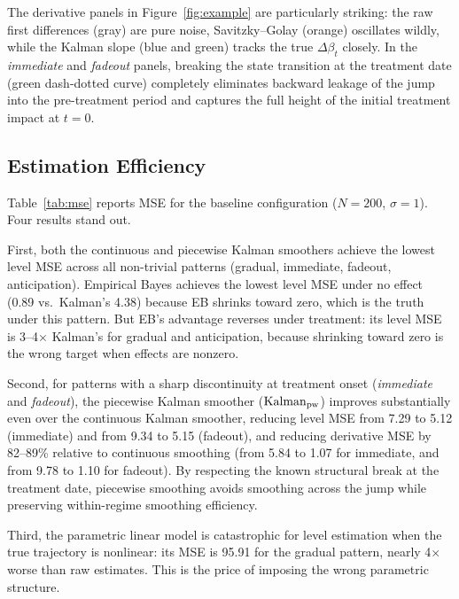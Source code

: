 \documentclass[12pt]{article}
\begin{document}
The derivative panels in Figure~\ref{fig:example} are particularly striking: the raw first differences (gray) are pure noise, Savitzky--Golay (orange) oscillates wildly, while the Kalman slope (blue and green) tracks the true $\Delta\beta_t$ closely. In the \emph{immediate} and \emph{fadeout} panels, breaking the state transition at the treatment date (green dash-dotted curve) completely eliminates backward leakage of the jump into the pre-treatment period and captures the full height of the initial treatment impact at $t = 0$.

\subsection{Estimation Efficiency}

Table~\ref{tab:mse} reports MSE for the baseline configuration ($N = 200$, $\sigma = 1$). Four results stand out.

\begin{table}[H]
\centering
\caption{Level and Derivative MSE ($\times 10^3$), $N = 200$, $\sigma = 1$, 1{,}000 simulations}\label{tab:mse}

\end{table}

First, both the continuous and piecewise Kalman smoothers achieve the lowest level MSE across all non-trivial patterns (gradual, immediate, fadeout, anticipation). Empirical Bayes achieves the lowest level MSE under no effect (0.89 vs.\ Kalman's 4.38) because EB shrinks toward zero, which is the truth under this pattern. But EB's advantage reverses under treatment: its level MSE is 3--4$\times$ Kalman's for gradual and anticipation, because shrinking toward zero is the wrong target when effects are nonzero.

Second, for patterns with a sharp discontinuity at treatment onset (\emph{immediate} and \emph{fadeout}), the piecewise Kalman smoother ($\text{Kalman}_{\rm pw}$) improves substantially even over the continuous Kalman smoother, reducing level MSE from 7.29 to 5.12 (immediate) and from 9.34 to 5.15 (fadeout), and reducing derivative MSE by 82--89\% relative to continuous smoothing (from 5.84 to 1.07 for immediate, and from 9.78 to 1.10 for fadeout). By respecting the known structural break at the treatment date, piecewise smoothing avoids smoothing across the jump while preserving within-regime smoothing efficiency.

Third, the parametric linear model is catastrophic for level estimation when the true trajectory is nonlinear: its MSE is 95.91 for the gradual pattern, nearly 4$\times$ worse than raw estimates. This is the price of imposing the wrong parametric structure.
\end{document}
